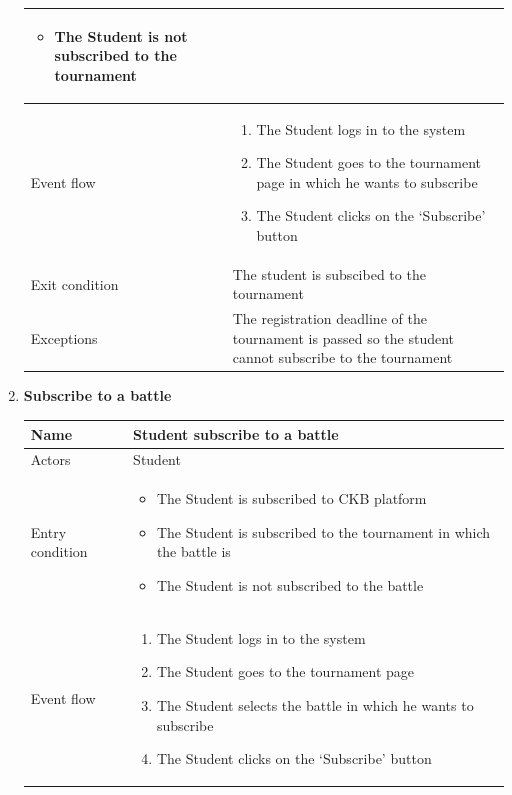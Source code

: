 \begin{enumerate}[label=UC\arabic*:]
\begin{tabular}{|p{3cm}|p{8cm}|}
\begin{itemize}
            \item The Student is not subscribed to the tournament
        \end{itemize}
        \\
        \hline
        Event flow &
        \begin{enumerate}[label=\arabic*.]
            \item The Student logs in to the system
            \item The Student goes to the tournament page in which he wants to subscribe
            \item The Student clicks on the `Subscribe' button
        \end{enumerate} \\
        \hline
        Exit condition & The student is subscibed to the tournament \\
        \hline
        Exceptions & The registration deadline of the tournament is passed so
        the student cannot subscribe to the tournament \\
        \hline
    \end{tabular}
    \item \textbf{Subscribe to a battle} \\
    \begin{tabular}{|p{3cm}|p{8cm}|}
        \hline
        Name & Student subscribe to a battle \\
        \hline
        Actors & Student \\
        \hline
        Entry condition &
        \begin{itemize}
            \item The Student is subscribed to CKB platform
            \item The Student is subscribed to the tournament in which the battle is
            \item The Student is not subscribed to the battle
        \end{itemize}
        \\
        \hline
        Event flow &
        \begin{enumerate}[label=\arabic*.]
            \item The Student logs in to the system
            \item The Student goes to the tournament page
            \item The Student selects the battle in which he wants to subscribe
            \item The Student clicks on the `Subscribe' button

\end{enumerate}
\end{tabular}
\end{enumerate}
